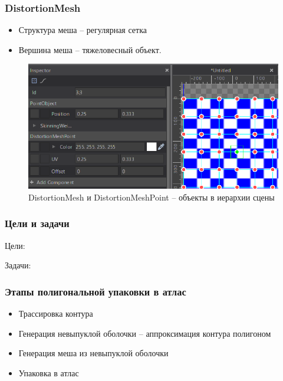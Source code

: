 \documentclass[10pt, unicode]{beamer}
\begin{document}
    \begin{frame}
        \frametitle{DistortionMesh}
        \begin{itemize}
            \item Структура меша -- регулярная сетка
            \item Вершина меша -- тяжеловесный объект.
        \end{itemize}
        \begin{figure}
            \centering
            \includegraphics[scale=0.5]{DistortionMesh.png}
            \caption{DistortionMesh и DistortionMeshPoint -- объекты в иерархии сцены}
        \end{figure}
    \end{frame}
    \begin{frame}
        \frametitle{Цели и задачи}
        Цели:
            
        Задачи:
            
    \end{frame}
    \begin{frame}
        \frametitle{Этапы полигональной упаковки в атлас}
        \begin{itemize}
            \item Трассировка контура
            \item Генерация невыпуклой оболочки -- аппроксимация контура полигоном
            \item Генерация меша из невыпуклой оболочки
            \item Упаковка в атлас
        \end{itemize}
    \end{frame}
\end{document}
